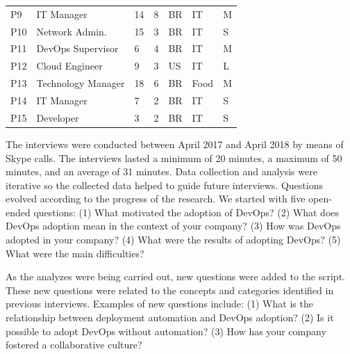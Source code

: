 \begin{table}[h!]
\begin{tabular}{p{0.5cm}p{4cm}p{0.4cm}p{0.45cm}p{0.5cm}p{1.8cm}p{0.3cm}}
P9                   & IT Manager            & 14           & 8           & BR            & IT                 & M                               \\ \centering

P10                  & Network Admin.        & 15           & 3           & BR            & IT                 & S                               \\ \centering

P11                  & DevOps Supervisor                & 6            & 4           & BR            & IT                  & M                               \\ \centering

P12                  & Cloud Engineer              & 9            & 3           & US            & IT                  & L                               \\ \centering

P13                  & Technology Manager                 & 18            & 6           & BR            & Food                  & M                               \\ \centering

P14                  & IT Manager            & 7            & 2           & BR            & IT                  & S                               \\ \centering

P15                  & Developer        & 3            & 2           & BR            & IT                  & S \\ \bottomrule
\end{tabular}
\end{table}



The interviews were conducted between April 2017 and April 2018 by means of Skype calls.
The interviews lasted a minimum of 20 minutes, a maximum of 50 minutes, and an average of 31 minutes.
Data collection and analysis were iterative so the collected data helped to guide
future interviews. Questions evolved according to
the progress of the research. We started with five open-ended questions: (1) What
motivated the adoption of DevOps? (2) What does DevOps adoption mean in the context of
your company? (3) How was DevOps adopted in your company? (4) What were the
results of adopting DevOps? (5) What were the main difficulties?

As the analyzes were being carried out, new questions were added to the script.
These new questions were related to the concepts and categories identified in
previous interviews. Examples of new questions include: (1) What is the
relationship between deployment automation and DevOps adoption? (2) Is it
possible to adopt DevOps without automation? (3) How has your company fostered a
collaborative culture?

